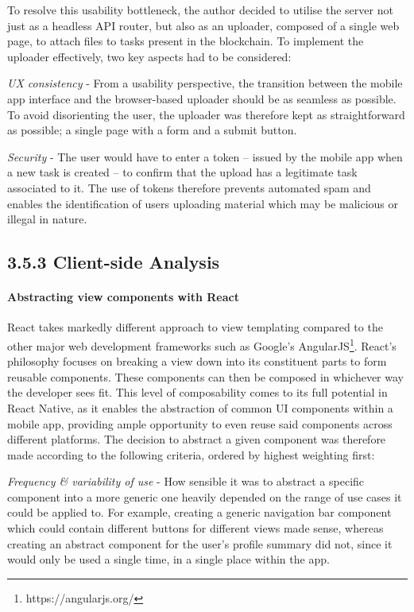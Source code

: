 \documentclass[12pt]{report}
\let\oldparagraph\paragraph
\renewcommand{\paragraph}[1]{\oldparagraph{#1}\mbox{}}
\begin{document}
To resolve this usability bottleneck, the author decided to utilise the
server not just as a headless API router, but also as an uploader,
composed of a single web page, to attach files to tasks present in the
blockchain. To implement the uploader effectively, two key aspects had
to be considered:

\emph{UX consistency} - From a usability perspective, the transition
between the mobile app interface and the browser-based uploader should
be as seamless as possible. To avoid disorienting the user, the uploader
was therefore kept as straightforward as possible; a single page with a
form and a submit button.

\emph{Security} - The user would have to enter a token -- issued by the
mobile app when a new task is created -- to confirm that the upload has
a legitimate task associated to it. The use of tokens therefore prevents
automated spam and enables the identification of users uploading
material which may be malicious or illegal in nature.

\subsection{3.5.3 Client-side Analysis}\label{client-side-analysis}

\paragraph{Abstracting view components with
React}\label{abstracting-view-components-with-react}

React takes markedly different approach to view templating compared to
the other major web development frameworks such as Google's
AngularJS\footnote{https://angularjs.org/}. React's philosophy
focuses on breaking a view down into its constituent parts to form
reusable components. These components can then be composed in whichever
way the developer sees fit. This level of composability comes to its
full potential in React Native, as it enables the abstraction of common
UI components within a mobile app, providing ample opportunity to even
reuse said components across different platforms. The decision to
abstract a given component was therefore made according to the following
criteria, ordered by highest weighting first:

\emph{Frequency \& variability of use} - How sensible it was to abstract
a specific component into a more generic one heavily depended on the
range of use cases it could be applied to. For example, creating a
generic navigation bar component which could contain different buttons
for different views made sense, whereas creating an abstract component
for the user's profile summary did not, since it would only be used a
single time, in a single place within the app.
\end{document}
